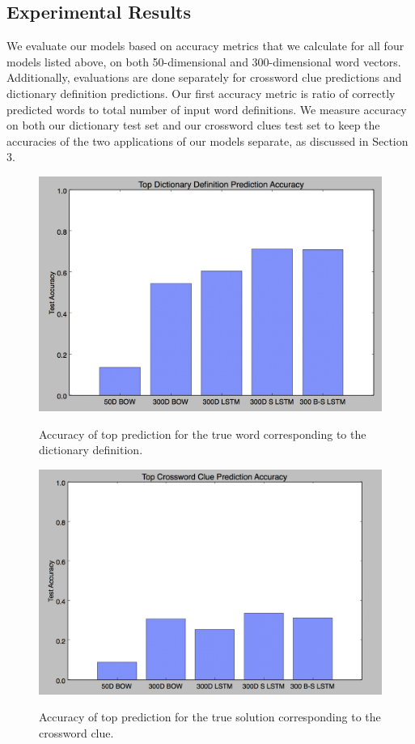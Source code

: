 \documentclass{article} %
\begin{document}
\subsection{Experimental Results}
We evaluate our models based on accuracy metrics that we calculate for all four models listed above, on both 50-dimensional and 300-dimensional word vectors. Additionally, evaluations are done separately for crossword clue predictions and dictionary definition predictions.
Our first accuracy metric is ratio of correctly predicted words to total number of input word definitions. We measure accuracy on both our dictionary test set and our crossword clues test set to keep the accuracies of the two applications of our models separate, as discussed in Section 3.

\begin{figure}
	\includegraphics{REAL_topdictdef.png}
	\label{Fig 1}
	\caption{Accuracy of top prediction for the true word corresponding to the dictionary definition.}
\end{figure}

\begin{figure}
	\includegraphics{REAL_topcrossclue.png}
	\label{Fig 2}
	\caption{Accuracy of top prediction for the true solution corresponding to the crossword clue.}
\end{figure}
\end{document}
